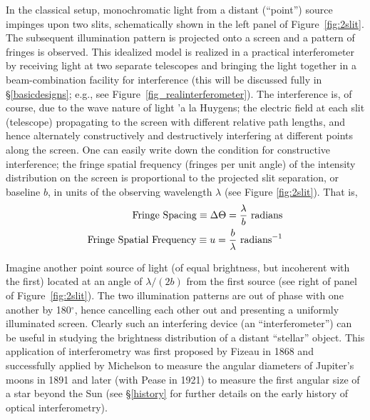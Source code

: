 \documentclass[12pt]{iopart}
\def\text{\rm}
\def\arcdegg{\hbox{$^\circ$}}
\begin{document}
In the classical setup, monochromatic light from a distant (``point'')
source impinges upon two slits, schematically shown in the left panel
of Figure~\ref{fig:2slit}.  The subsequent illumination pattern is
projected onto a screen and a pattern of fringes is observed.  This
idealized model is realized in a practical interferometer by receiving
light at two separate telescopes and bringing the light together in a
beam-combination facility for interference (this will be discussed
fully in \S\ref{basicdesigns}; e.g., see
Figure~\ref{fig_realinterferometer}).  The interference is, of course,
due to the wave nature of light \a'a la Huygens; the electric field at
each slit (telescope) propagating to the screen with different
relative path lengths, and hence alternately constructively and
destructively interfering at different points along the screen.  One
can easily write down the condition for constructive interference; the
fringe spatial frequency (fringes per unit angle) of the intensity
distribution on the screen is proportional to the projected slit
separation, or baseline $b$, in units of the observing wavelength
$\lambda$ (see Figure \ref{fig:2slit}).  That is,
\begin{eqnarray}
 {\text{Fringe~Spacing}}  \equiv  \Delta\Theta  =  \frac{\lambda}{b} 
{\text{~radians}} \\
 {\text{Fringe~Spatial~Frequency}}  \equiv  u  =  \frac{b}{\lambda} {\text{~radians}^{-1}}
\end{eqnarray}

Imagine another point source of light (of equal brightness, but
incoherent with the first) located at an angle of $\lambda/(2b)$ from
the first source (see right of panel of Figure~\ref{fig:2slit}).  The
two illumination patterns are out of phase with one another by
180\arcdegg, hence cancelling each other out and presenting a
uniformly illuminated screen.  Clearly such an interfering
device (an ``interferometer'') can be useful in studying the
brightness distribution of a distant ``stellar'' object.  This
application of interferometry was first proposed by Fizeau in 1868
\citep{fizeau68} and successfully applied by Michelson to measure the
angular diameters of Jupiter's moons \citep{michelson90,michelson91}
in 1891 and later (with Pease in 1921) to measure the first angular
size of a star beyond the Sun \citep{michelson21} (see \S\ref{history}
for further details on the early history of optical interferometry).
\end{document}
